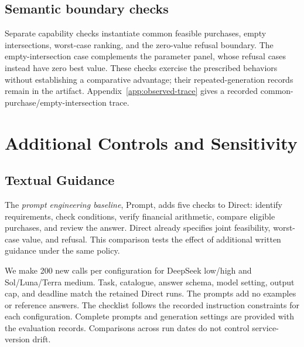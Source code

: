 \documentclass[11pt]{article}
\begin{document}
\subsection{Semantic boundary checks}
\label{app:intent-boundaries}
Separate capability checks instantiate common feasible purchases, empty intersections, worst-case ranking, and the zero-value refusal boundary. The empty-intersection case complements the parameter panel, whose refusal cases instead have zero best value. These checks exercise the prescribed behaviors without establishing a comparative advantage; their repeated-generation records remain in the artifact. Appendix~\ref{app:observed-trace} gives a recorded common-purchase/empty-intersection trace.
\section{Additional Controls and Sensitivity}
\label{app:execution}
\subsection{Textual Guidance}
\label{app:prompt-controls}
The \emph{prompt engineering baseline}, Prompt, adds five checks to Direct: identify requirements, check conditions, verify financial arithmetic, compare eligible purchases, and review the answer. Direct already specifies joint feasibility, worst-case value, and refusal. This comparison tests the effect of additional written guidance under the same policy.

We make 200 new calls per configuration for DeepSeek low/high and Sol/Luna/Terra medium. Task, catalogue, answer schema, model setting, output cap, and deadline match the retained Direct runs. The prompts add no examples or reference answers. The checklist follows the recorded instruction constraints for each configuration. Complete prompts and generation settings are provided with the evaluation records. Comparisons across run dates do not control service-version drift.
\end{document}
